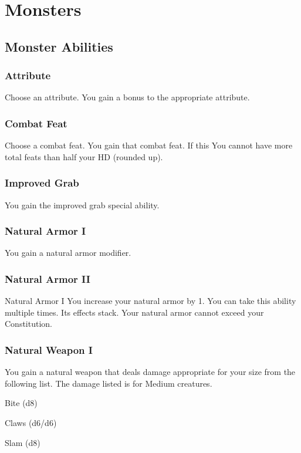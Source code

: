 
\section{Monsters}

\subsection{Monster Abilities}

\subsubsection{Attribute}
Choose an attribute.
\featben You gain a  bonus to the appropriate attribute.

\subsubsection{Combat Feat}
Choose a combat feat.
\featben You gain that combat feat. If this  
 You cannot have more total feats than half your HD (rounded up).

\subsubsection{Improved Grab}
\featben You gain the improved grab special ability. 

\subsubsection{Natural Armor I}
\featben You gain a  natural armor modifier.

\subsubsection{Natural Armor II}
\featpre Natural Armor I
\featben You increase your natural armor by 1.
 You can take this ability multiple times. Its effects stack. Your natural armor cannot exceed your Constitution.

\subsubsection{Natural Weapon I}
\featben You gain a natural weapon that deals damage appropriate for your size from the following list. The damage listed is for Medium creatures.
\begin{itemize*}
    \item Bite (d8)
    \item Claws (d6/d6)
    \item Slam (d8)
\end{itemize*}

